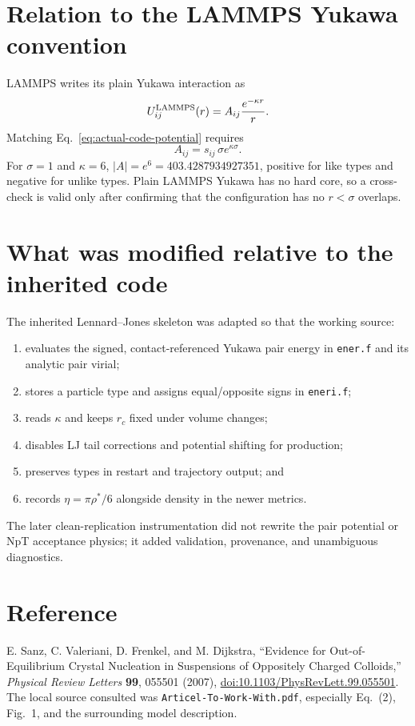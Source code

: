 \documentclass[11pt,a4paper]{article}
\newcommand{\code}[1]{\texttt{#1}}
\newcommand{\sgnq}{s_{ij}}
\begin{document}
\section{Relation to the LAMMPS Yukawa convention}
LAMMPS writes its plain Yukawa interaction as
\begin{equation}
 U_{ij}^{\rm LAMMPS}(r)=A_{ij}\frac{e^{-\kappa r}}{r}.
\end{equation}
Matching Eq.~\eqref{eq:actual-code-potential} requires
\begin{equation}
 A_{ij}=\sgnq\,\sigma e^{\kappa\sigma}.
\end{equation}
For $\sigma=1$ and $\kappa=6$, $|A|=e^6=403.4287934927351$, positive for
like types and negative for unlike types.  Plain LAMMPS Yukawa has no hard
core, so a cross-check is valid only after confirming that the configuration
has no $r<\sigma$ overlaps.

\section{What was modified relative to the inherited code}
The inherited Lennard--Jones skeleton was adapted so that the working source:
\begin{enumerate}
\item evaluates the signed, contact-referenced Yukawa pair energy in
\code{ener.f} and its analytic pair virial;
\item stores a particle type and assigns equal/opposite signs in
\code{eneri.f};
\item reads $\kappa$ and keeps $r_c$ fixed under volume changes;
\item disables LJ tail corrections and potential shifting for production;
\item preserves types in restart and trajectory output; and
\item records $\eta=\pi\rho^*/6$ alongside density in the newer metrics.
\end{enumerate}
The later clean-replication instrumentation did not rewrite the pair
potential or NpT acceptance physics; it added validation, provenance, and
unambiguous diagnostics.

\section{Reference}
E. Sanz, C. Valeriani, D. Frenkel, and M. Dijkstra, ``Evidence for
Out-of-Equilibrium Crystal Nucleation in Suspensions of Oppositely Charged
Colloids,'' \emph{Physical Review Letters} \textbf{99}, 055501 (2007),
\href{https://doi.org/10.1103/PhysRevLett.99.055501}{doi:10.1103/PhysRevLett.99.055501}.
The local source consulted was \code{Articel-To-Work-With.pdf}, especially
Eq.~(2), Fig.~1, and the surrounding model description.
\end{document}
